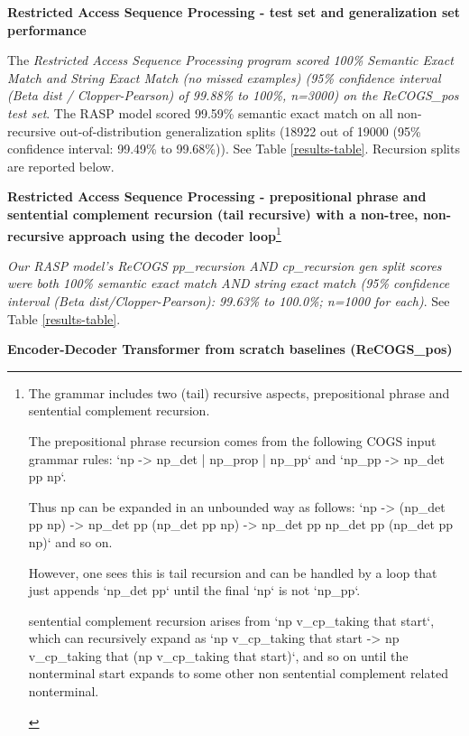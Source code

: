 \documentclass[11pt]{article}
\begin{document}
\textbf{ Restricted Access Sequence Processing - test set and generalization set performance}

The \textit{Restricted Access Sequence Processing program scored 100\% Semantic Exact Match and String Exact Match (no missed examples) (95\% confidence interval (Beta dist / Clopper-Pearson) of 99.88\% to 100\%, n=3000) on the ReCOGS\_pos test set}. The RASP model scored 99.59\% semantic exact match on all non-recursive out-of-distribution generalization splits (18922 out of 19000 (95\% confidence interval: 99.49\% to 99.68\%)). See Table \ref{results-table}. Recursion splits are reported below.

\textbf{Restricted Access Sequence Processing - prepositional phrase and sentential complement recursion (tail recursive) with a non-tree, non-recursive approach using the decoder loop}\footnote{\begin{footnotesize}The grammar includes two (tail) recursive aspects, prepositional phrase and sentential complement recursion.

The prepositional phrase recursion comes from the following COGS input grammar rules: `np -> np\_det | np\_prop | np\_pp` and `np\_pp -> np\_det pp np`.

Thus np can be expanded in an unbounded way as follows: `np -> (np\_det pp np) -> np\_det pp (np\_det pp np) -> np\_det pp np\_det pp (np\_det pp np)` and so on.

However, one sees this is tail recursion and can be handled by a loop that just appends `np\_det pp` until the final `np` is not `np\_pp`.

sentential complement recursion 
arises from `np v\_cp\_taking that start`, 
which can recursively expand as `np v\_cp\_taking that start -> np v\_cp\_taking that (np v\_cp\_taking that start)`, and so on until the nonterminal start expands to some other non sentential complement related nonterminal.
\end{footnotesize}
}

\textit{Our RASP model's ReCOGS pp\_recursion AND cp\_recursion gen split scores were both 100\% semantic exact match AND string exact match (95\% confidence interval (Beta dist/Clopper-Pearson): 99.63\% to 100.0\%; n=1000 for each)}. See Table \ref{results-table}.

\textbf{\citep{Wu2023} Encoder-Decoder Transformer from scratch baselines (ReCOGS\_pos)}
\end{document}
